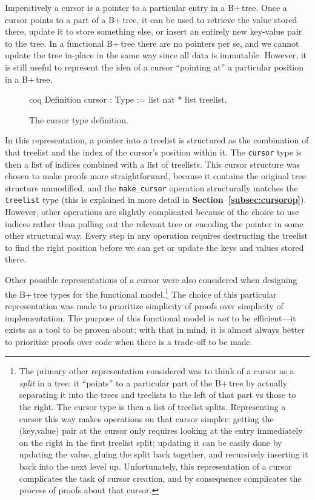 \documentclass[12pt]{article}
\begin{document}
Imperatively a cursor is a pointer to a particular entry in a B+\,tree. Once a cursor points to a part of a B+\,tree, it can be used to retrieve the value stored there, update it to store something else, or insert an entirely new key-value pair to the tree. In a functional B+\,tree there are no pointers per se, and we cannot update the tree in-place in the same way since all data is immutable. However, it is still useful to represent the idea of a cursor “pointing at” a particular position in a B+\,tree.

\begin{singlespace}
\begin{figure}[ht]
\centering
\begin{cminted}{coq}
Definition cursor : Type := list nat * list treelist.
\end{cminted}
\caption{The cursor type definition.}
\end{figure}
\end{singlespace}

In this representation, a pointer into a treelist is structured as the combination of that treelist and the index of the cursor’s position within it. The \texttt{cursor} type is then a list of indices combined with a list of treelists. This cursor structure was chosen to make proofs more straightforward, because it contains the original tree structure unmodified, and the \texttt{make\_cursor} operation structurally matches the \texttt{treelist} type (this is explained in more detail in \textbf{Section~\ref{subsec:cursorop}}). However, other operations are slightly complicated because of the choice to use indices rather than pulling out the relevant tree or encoding the pointer in some other structural way. Every step in any operation requires destructing the treelist to find the right position before we can get or update the keys and values stored there.

Other possible representations of a cursor were also considered when designing the B+\,tree types for the functional model.\footnote{The primary other representation considered was to think of a cursor as a \textit{split} in a tree: it “points” to a particular part of the B+\,tree by actually separating it into the trees and treelists to the left of that part vs those to the right. The cursor type is then a list of treelist splits. Representing a cursor this way makes operations on that cursor simpler: getting the (key,value) pair at the cursor only requires looking at the entry immediately on the right in the first treelist split; updating it can be easily done by updating the value, gluing the split back together, and recursively inserting it back into the next level up. Unfortunately, this representation of a cursor complicates the task of cursor creation, and by consequence complicates the process of proofs about that cursor.} The choice of this particular representation was made to prioritize simplicity of proofs over simplicity of implementation. The purpose of this functional model is \textit{not} to be efficient---it exists as a tool to be proven about; with that in mind, it is almost always better to prioritize proofs over code when there is a trade-off to be made.
\end{document}
